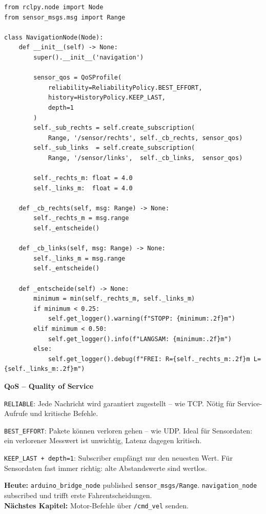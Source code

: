\begin{lstlisting}
from rclpy.node import Node
from sensor_msgs.msg import Range

class NavigationNode(Node):
    def __init__(self) -> None:
        super().__init__('navigation')

        sensor_qos = QoSProfile(
            reliability=ReliabilityPolicy.BEST_EFFORT,
            history=HistoryPolicy.KEEP_LAST,
            depth=1
        )
        self._sub_rechts = self.create_subscription(
            Range, '/sensor/rechts', self._cb_rechts, sensor_qos)
        self._sub_links  = self.create_subscription(
            Range, '/sensor/links',  self._cb_links,  sensor_qos)

        self._rechts_m: float = 4.0
        self._links_m:  float = 4.0

    def _cb_rechts(self, msg: Range) -> None:
        self._rechts_m = msg.range
        self._entscheide()

    def _cb_links(self, msg: Range) -> None:
        self._links_m = msg.range
        self._entscheide()

    def _entscheide(self) -> None:
        minimum = min(self._rechts_m, self._links_m)
        if minimum < 0.25:
            self.get_logger().warning(f"STOPP: {minimum:.2f}m")
        elif minimum < 0.50:
            self.get_logger().info(f"LANGSAM: {minimum:.2f}m")
        else:
            self.get_logger().debug(f"FREI: R={self._rechts_m:.2f}m L={self._links_m:.2f}m")
\end{lstlisting}

\begin{haubeBox}
\textbf{QoS -- Quality of Service}

\texttt{RELIABLE}: Jede Nachricht wird garantiert zugestellt -- wie TCP.
Nötig für Service-Aufrufe und kritische Befehle.

\texttt{BEST\_EFFORT}: Pakete können verloren gehen -- wie UDP.
Ideal für Sensordaten: ein verlorener Messwert ist unwichtig,
Latenz dagegen kritisch.

\texttt{KEEP\_LAST + depth=1}: Subscriber empfängt nur den neuesten Wert.
Für Sensordaten fast immer richtig: alte Abstandswerte sind wertlos.
\end{haubeBox}

\begin{projektBox}
\textbf{Heute:} \texttt{arduino\_bridge\_node} published \texttt{sensor\_msgs/Range}.
\texttt{navigation\_node} subscribed und trifft erste Fahrentscheidungen.\\
\textbf{Nächstes Kapitel:} Motor-Befehle über \texttt{/cmd\_vel} senden.
\end{projektBox}


